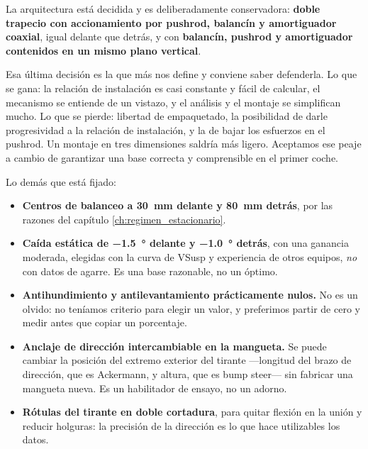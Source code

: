 
\begin{caso}
La arquitectura está decidida y es deliberadamente conservadora: \textbf{doble
trapecio con accionamiento por pushrod, balancín y amortiguador coaxial}, igual
delante que detrás, y con \textbf{balancín, pushrod y amortiguador contenidos
en un mismo plano vertical}.

Esa última decisión es la que más nos define y conviene saber defenderla. Lo
que se gana: la relación de instalación es casi constante y fácil de calcular,
el mecanismo se entiende de un vistazo, y el análisis y el montaje se
simplifican mucho. Lo que se pierde: libertad de empaquetado, la posibilidad de
darle progresividad a la relación de instalación, y la de bajar los esfuerzos
en el pushrod. Un montaje en tres dimensiones saldría más ligero. Aceptamos ese
peaje a cambio de garantizar una base correcta y comprensible en el primer
coche.

Lo demás que está fijado:

\begin{itemize}
  \item \textbf{Centros de balanceo a \SI{30}{\milli\meter} delante y
        \SI{80}{\milli\meter} detrás}, por las razones del capítulo
        \ref{ch:regimen_estacionario}.
  \item \textbf{Caída estática de \SI{-1.5}{\degree} delante y
        \SI{-1.0}{\degree} detrás}, con una ganancia moderada, elegidas con la
        curva de VSusp y experiencia de otros equipos, \emph{no} con datos de
        agarre. Es una base razonable, no un óptimo.
  \item \textbf{Antihundimiento y antilevantamiento prácticamente nulos.} No es
        un olvido: no teníamos criterio para elegir un valor, y preferimos
        partir de cero y medir antes que copiar un porcentaje.
  \item \textbf{Anclaje de dirección intercambiable en la mangueta.} Se puede
        cambiar la posición del extremo exterior del tirante ---longitud del
        brazo de dirección, que es Ackermann, y altura, que es bump steer---
        sin fabricar una mangueta nueva. Es un habilitador de ensayo, no un
        adorno.
  \item \textbf{Rótulas del tirante en doble cortadura}, para quitar flexión en
        la unión y reducir holguras: la precisión de la dirección es lo que
        hace utilizables los datos.
\end{itemize}


\end{caso}
